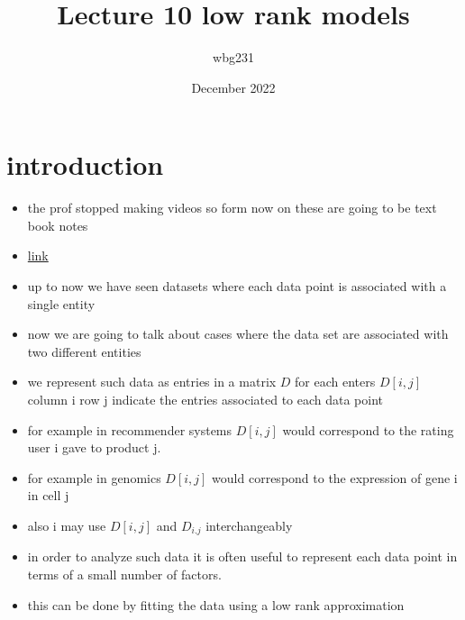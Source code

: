\documentclass{article}
\title{Lecture 10 low rank models}
\author{wbg231 }
\date{December 2022}
\begin{document}
\maketitle

\section*{introduction}
\begin{itemize}
\item the prof stopped making videos so form now on these are going to be text book notes 
\item \href{https://brightspace.nyu.edu/content/enforced/249915-794-1234_SP23DS-GAMATH-GA28403001005/notes/pca.pdf}{link}
\item up to now we have seen datasets where each data point is associated with a single entity 
\item now we are going to talk about cases where the data set are associated with two different entities
\item we represent such data as entries in a matrix $D$ for each enters $D[i,j]$ column i row j indicate the entries associated to each data point 
\item for example in recommender systems $D[i,j]$ would correspond to the rating user i gave to product j. 
\item for example in genomics $D[i,j]$ would correspond to the expression of gene i in cell j 
\item also i may use $D[i,j]$ and $D_{i.j}$ interchangeably 
\item in order to analyze such data it is often useful to represent each data point in terms of a small number of factors. 
\item this can be done by fitting the data using a low rank approximation 

\end{itemize}
\end{document}
